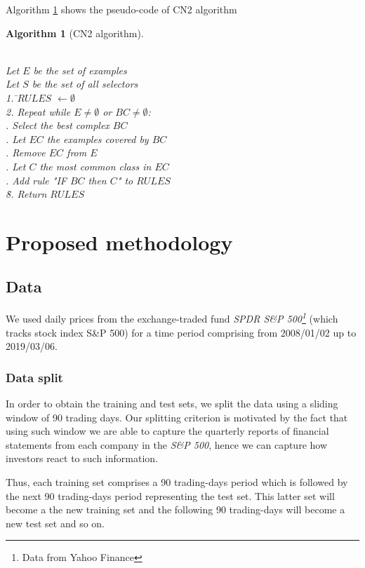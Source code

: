 \documentclass[preprint,3p,twocolumn]{elsarticle}
\newtheorem{algorithm}{Algorithm}[section]
\begin{document}
Algorithm \ref{algo:CN2} shows the pseudo-code of CN2 algorithm
\begin{algorithm}[CN2 algorithm]
\begin{tabbing}
\\Let $E$ be the set of examples
\\Let $S$ be the set of all selectors\\
1. \=$RULES$ $\leftarrow \emptyset $ \\
2. Repeat while $E \neq \emptyset$ or $BC \neq \emptyset$:\\
 . Select the best complex $BC$\\
 . Let $EC$ the examples covered by $BC$ \\
 . Remove $EC$ from $E$\\
 . Let $C$ the most common class in $EC$\\
 . Add rule "IF $BC$ then $C$" to $RULES$\\
\=8. Return $RULES$
\end{tabbing}
\label{algo:CN2}
\end{algorithm}


\section{Proposed methodology}
\label{sec:proposed methodology}
\subsection{Data}
\label{subsec:data}
We used daily prices from the exchange-traded fund \textit{SPDR S\&P 500\footnote{Data from Yahoo Finance}} (which tracks stock index S\&P 500) for a time period comprising from 2008/01/02 up to 2019/03/06.

\subsubsection{Data split}
\label{subsubsec:data split}
In order to obtain the training and test sets, we split the data using a sliding window of 90 trading days. Our splitting criterion is motivated by the fact that using such window we are able to capture the quarterly reports of financial statements from each company in the \textit{S\&P 500}, hence we can capture how investors react to such information.

Thus, each training set comprises a 90 trading-days period which is followed by the next 90 trading-days period representing the test set. This latter set will become a the new training set and the following 90 trading-days will become a new test set and so on.
\end{document}
